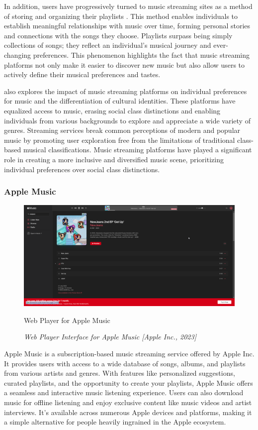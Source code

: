 In addition, users have progressively turned to music streaming sites as a method of storing and organizing their playlists \parencite{ellis20}. This method enables individuals to establish meaningful relationships with music over time, forming personal stories and connections with the songs they choose. Playlists surpass being simply collections of songs; they reflect an individual's musical journey and ever-changing preferences. This phenomenon highlights the fact that music streaming platforms not only make it easier to discover new music but also allow users to actively define their musical preferences and tastes. \pagebreak

\textcite{webster19} also explores the impact of music streaming platforms on individual preferences for music and the differentiation of cultural identities. These platforms have equalized access to music, erasing social class distinctions and enabling individuals from various backgrounds to explore and appreciate a wide variety of genres. Streaming services break common perceptions of modern and popular music by promoting user exploration free from the limitations of traditional class-based musical classifications. Music streaming platforms have played a significant role in creating a more inclusive and diversified music scene, prioritizing individual preferences over social class distinctions.

\subsubsection{Apple Music}
\begin{figure}[h]
    \centering
    \includegraphics[width=1.0\linewidth]{mainmatter/images/musicplat1.png}
    \caption{Web Player for Apple Music}
    \caption*{\textit{Web Player Interface for Apple Music [Apple Inc., 2023]}}
    \label{fig:myfig6}
\end{figure}
Apple Music is a subscription-based music streaming service offered by Apple Inc. It provides users with access to a wide database of songs, albums, and playlists from various artists and genres. With features like personalized suggestions, curated playlists, and the opportunity to create your playlists, Apple Music offers a seamless and interactive music listening experience. Users can also download music for offline listening and enjoy exclusive content like music videos and artist interviews. It's available across numerous Apple devices and platforms, making it a simple alternative for people heavily ingrained in the Apple ecosystem. \pagebreak

